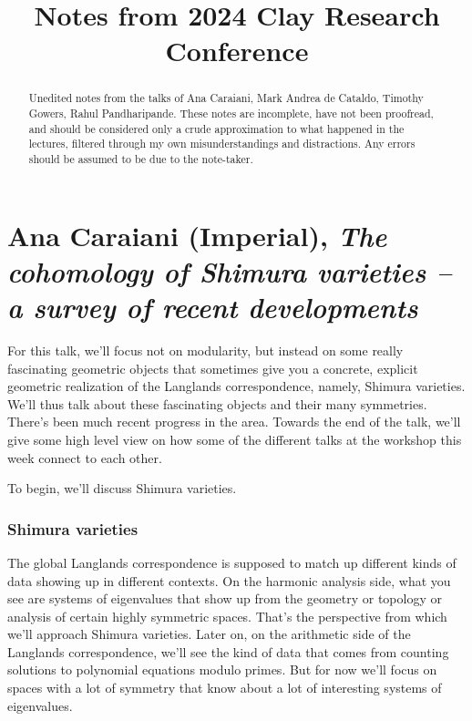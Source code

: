 \documentclass[reqno]{amsart} 
\begin{document}
\title{Notes from 2024 Clay Research Conference}

\begin{abstract}
  Unedited notes from the talks of Ana Caraiani, Mark Andrea de Cataldo, Timothy Gowers, Rahul Pandharipande.  These notes are incomplete, have not been proofread, and should be considered only a crude approximation to what happened in the lectures, filtered through my own misunderstandings and distractions.  Any errors should be assumed to be due to the note-taker.
\end{abstract}

\maketitle

\tableofcontents

\part{Ana Caraiani (Imperial), \emph{The cohomology of Shimura varieties – a survey of recent developments}}

For this talk, we'll focus not on modularity, but instead on some really fascinating geometric objects that sometimes give you a concrete, explicit geometric realization of the Langlands correspondence, namely, Shimura varieties.  We'll thus talk about these fascinating objects and their many symmetries.  There's been much recent progress in the area.  Towards the end of the talk, we'll give some high level view on how some of the different talks at the workshop this week connect to each other.

To begin, we'll discuss Shimura varieties.

\section{Shimura varieties}

The global Langlands correspondence is supposed to match up different kinds of data showing up in different contexts.  On the harmonic analysis side, what you see are systems of eigenvalues that show up from the geometry or topology or analysis of certain highly symmetric spaces.  That's the perspective from which we'll approach Shimura varieties.  Later on, on the arithmetic side of the Langlands correspondence, we'll see the kind of data that comes from counting solutions to polynomial equations modulo primes.  But for now we'll focus on spaces with a lot of symmetry that know about a lot of interesting systems of eigenvalues.
\end{document}
